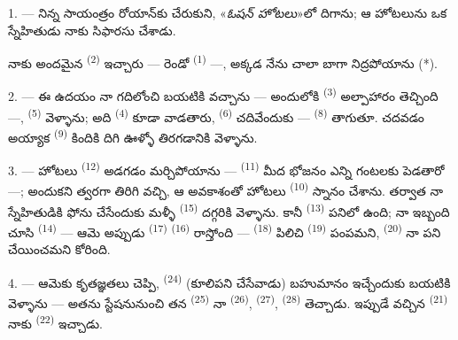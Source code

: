 
\VUsaut{3.0mm}
\VUsaut{1.6mm}
\VUsaut{2.0mm}
\VUsaut{3.4mm}

1. --- నిన్న సాయంత్రం రోయాన్‌కు చేరుకుని, «\textit{ఓషన్ హోటలు}»లో దిగాను; ఆ హోటలును ఒక
స్నేహితుడు నాకు సిఫారసు చేశాడు.

నాకు అందమైన  \textsuperscript{(2)} ఇచ్చారు — రెండో 
\textsuperscript{(1)} —, అక్కడ నేను చాలా బాగా నిద్రపోయాను (*).

2. --- ఈ ఉదయం నా గదిలోంచి బయటికి వచ్చాను — అందులోకి 
\textsuperscript{(3)} అల్పాహారం తెచ్చింది —,  \textsuperscript{(5)}
వెళ్ళాను; అది  \textsuperscript{(4)} కూడా వాడతారు,
 \textsuperscript{(6)} చదివేందుకు — 
\textsuperscript{(8)} తాగుతూ. చదవడం అయ్యాక  \textsuperscript{(9)} కిందికి
దిగి ఊళ్ళో తిరగడానికి వెళ్ళాను.

3. --- హోటలు  \textsuperscript{(12)} అడగడం మర్చిపోయాను —
 \textsuperscript{(11)} మీద భోజనం ఎన్ని గంటలకు పెడతారో —; అందుకని
త్వరగా తిరిగి వచ్చి, ఆ అవకాశంతో హోటలు  \textsuperscript{(10)} స్నానం
చేశాను. తర్వాత నా స్నేహితుడికి ఫోను చేసేందుకు మళ్ళీ 
\textsuperscript{(15)} దగ్గరికి వెళ్ళాను. కానీ  \textsuperscript{(13)}
పనిలో ఉంది; నా ఇబ్బంది చూసి  \textsuperscript{(14)} — ఆమె అప్పుడు
 \textsuperscript{(17)} 
\textsuperscript{(16)} రాస్తోంది —  \textsuperscript{(18)} పిలిచి
 \textsuperscript{(19)} పంపమని, 
\textsuperscript{(20)} నా పని చేయించమని కోరింది.

4. --- ఆమెకు కృతజ్ఞతలు చెప్పి,  \textsuperscript{(24)} (కూలిపని
చేసేవాడు) బహుమానం ఇచ్చేందుకు బయటికి వెళ్ళాను — అతను స్టేషనునుంచి తన 
\textsuperscript{(25)} నా  \textsuperscript{(26)},
 \textsuperscript{(27)}, 
\textsuperscript{(28)} తెచ్చాడు. ఇప్పుడే వచ్చిన  \textsuperscript{(21)}
నాకు  \textsuperscript{(22)} ఇచ్చాడు.

